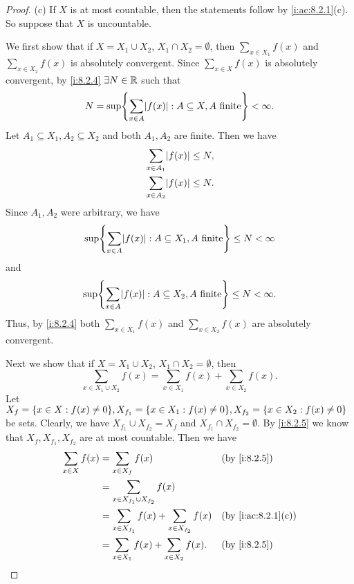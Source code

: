 \begin{proof}{(c)}
  If \(X\) is at most countable, then the statements follow by \cref{i:ac:8.2.1}(c).
  So suppose that \(X\) is uncountable.

  We first show that if \(X = X_1 \cup X_2\), \(X_1 \cap X_2 = \emptyset\), then \(\sum_{x \in X_1} f(x)\) and \(\sum_{x \in X_2} f(x)\) is absolutely convergent.
  Since \(\sum_{x \in X} f(x)\) is absolutely convergent, by \cref{i:8.2.4} \(\exists N \in \mathbb{R}\) such that
  \[
    N = \sup\set{\sum_{x \in A} \abs{f(x)} : A \subseteq X, A \text{ finite}} < \infty.
  \]
  Let \(A_1 \subseteq X_1, A_2 \subseteq X_2\) and both \(A_1, A_2\) are finite.
  Then we have
  \begin{align*}
     & \sum_{x \in A_1} \abs{f(x)} \leq N, \\
     & \sum_{x \in A_2} \abs{f(x)} \leq N.
  \end{align*}
  Since \(A_1, A_2\) were arbitrary, we have
  \[
    \sup\set{\sum_{x \in A} \abs{f(x)} : A \subseteq X_1, A \text{ finite}} \leq N < \infty
  \]
  and
  \[
    \sup\set{\sum_{x \in A} \abs{f(x)} : A \subseteq X_2, A \text{ finite}} \leq N < \infty.
  \]
  Thus, by \cref{i:8.2.4} both \(\sum_{x \in X_1} f(x)\) and \(\sum_{x \in X_2} f(x)\) are absolutely convergent.

  Next we show that if \(X = X_1 \cup X_2\), \(X_1 \cap X_2 = \emptyset\), then
  \[
    \sum_{x \in X_1 \cup X_2} f(x) = \sum_{x \in X_1} f(x) + \sum_{x \in X_2} f(x).
  \]
  Let \(X_f = \set{x \in X : f(x) \neq 0}, X_{f_1} = \set{x \in X_1 : f(x) \neq 0}, X_{f_2} = \set{x \in X_2 : f(x) \neq 0}\) be sets.
  Clearly, we have \(X_{f_1} \cup X_{f_2} = X_f\) and \(X_{f_1} \cap X_{f_2} = \emptyset\).
  By \cref{i:8.2.5} we know that \(X_f, X_{f_1}, X_{f_2}\) are at most countable.
  Then we have
  \begin{align*}
    \sum_{x \in X} f(x) & = \sum_{x \in X_f} f(x)                                 &  & \by{i:8.2.5}       \\
                        & = \sum_{x \in X_{f_1} \cup X_{f_2}} f(x)                                        \\
                        & = \sum_{x \in X_{f_1}} f(x) + \sum_{x \in X_{f_2}} f(x) &  & \by{i:ac:8.2.1}[c] \\
                        & = \sum_{x \in X_1} f(x) + \sum_{x \in X_2} f(x).        &  & \by{i:8.2.5}
  \end{align*}


\end{proof}

